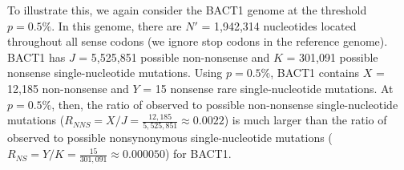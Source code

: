 To illustrate this, we again consider
the BACT1 genome at the threshold $p = 0.5\%$.
%
In this genome, there are $N'$ = 1,942,314 nucleotides
located throughout all sense codons (we ignore stop codons in the reference genome).
%
BACT1 has $J$ = 5,525,851 possible non-nonsense and
$K$ = 301,091 possible nonsense single-nucleotide mutations.
%
Using $p = 0.5\%$, BACT1 contains
$X$ = 12,185 non-nonsense and
$Y$ = 15 nonsense rare single-nucleotide mutations.
%
At $p = 0.5\%$, then, the ratio of observed to possible non-nonsense single-nucleotide mutations
($R_{NNS} = X / J = \frac{12,185}{5,525,851}
\approx 0.0022$)
is much larger than the ratio of observed to possible nonsynonymous single-nucleotide mutations
($R_{NS} = Y / K = \frac{15}{301,091}
\approx 0.000050$)
for BACT1.
\endinput